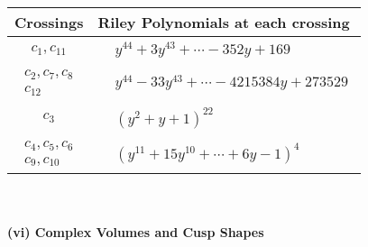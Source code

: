 \documentclass[1p]{elsarticle_modified}
\theoremstyle{definition}
\begin{document}
\begin{tabular}{m{50pt}|m{274pt}}
Crossings & \hspace{64pt}Riley Polynomials at each crossing \\
\hline $$\begin{aligned}c_{1},c_{11}\end{aligned}$$&$\begin{aligned}
&y^{44}+3 y^{43}+\cdots-352 y+169
\end{aligned}$\\
\hline $$\begin{aligned}c_{2},c_{7},c_{8}\\c_{12}\end{aligned}$$&$\begin{aligned}
&y^{44}-33 y^{43}+\cdots-4215384 y+273529
\end{aligned}$\\
\hline $$\begin{aligned}c_{3}\end{aligned}$$&$\begin{aligned}
&(y^2+y+1)^{22}
\end{aligned}$\\
\hline $$\begin{aligned}c_{4},c_{5},c_{6}\\c_{9},c_{10}\end{aligned}$$&$\begin{aligned}
&(y^{11}+15 y^{10}+\cdots+6 y-1)^{4}
\end{aligned}$\\
\hline
\end{tabular}\\~\\
\newpage\flushleft \textbf{(vi) Complex Volumes and Cusp Shapes}
\end{document}
